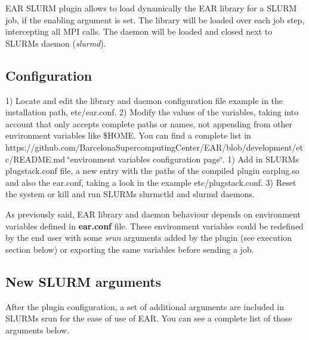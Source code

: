 E\+AR S\+L\+U\+RM plugin allows to load dynamically the E\+AR library for a S\+L\+U\+RM job, if the enabling argument is set. The library will be loaded over each job step, intercepting all M\+PI calls. The daemon will be loaded and closed next to S\+L\+U\+RM\textquotesingle{}s daemon ({\itshape slurmd}).

\subsection*{Configuration }

1) Locate and edit the library and daemon configuration file example in the installation path, {\ttfamily etc/ear.\+conf}. 2) Modify the values of the variables, taking into account that only accepts complete paths or names, not appending from other environment variables like {\ttfamily \$\+H\+O\+ME}. You can find a complete list in https\+://github.com/\+Barcelona\+Supercomputing\+Center/\+E\+A\+R/blob/development/etc/\+R\+E\+A\+D\+M\+E.\+md \char`\"{}environment variables configuration page\char`\"{}. 1) Add in S\+L\+U\+RM\textquotesingle{}s {\ttfamily plugstack.\+conf} file, a new entry with the paths of the compiled plugin {\ttfamily earplug.\+so} and also the {\ttfamily ear.\+conf}, taking a look in the example {\ttfamily etc/plugstack.\+conf}. 3) Reset the system or kill and run S\+L\+U\+RM\textquotesingle{}s slurmctld and slurmd daemons.

As previously said, E\+AR library and daemon behaviour depends on environment variables defined in {\bfseries ear.\+conf} file. These environment variables could be redefined by the end user with some {\itshape srun} arguments added by the plugin (see execution section below) or exporting the same variables before sending a job.

\subsection*{New S\+L\+U\+RM arguments }

After the plugin configuration, a set of additional arguments are included in S\+L\+U\+RM\textquotesingle{}s {\ttfamily srun} for the ease of use of E\+AR. You can see a complete list of those arguments below.

